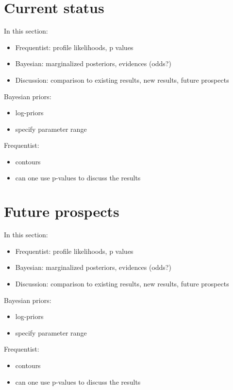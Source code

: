 \section{Current status}
\label{examples}

In this section:
\begin{itemize}
  \item Frequentist: profile likelihoods, p values
  \item Bayesian: marginalized posteriors, evidences (odds?)
  \item Discussion: comparison to existing results, new results, future prospects
\end{itemize}

Bayesian priors:
\begin{itemize}
  \item log-priors
  \item specify parameter range
\end{itemize}

Frequentist:
\begin{itemize}
  \item contours
  \item can one use p-values to discuss the results
\end{itemize}


\section{Future prospects}
\label{examples}

In this section:
\begin{itemize}
  \item Frequentist: profile likelihoods, p values
  \item Bayesian: marginalized posteriors, evidences (odds?)
  \item Discussion: comparison to existing results, new results, future prospects
\end{itemize}

Bayesian priors:
\begin{itemize}
  \item log-priors
  \item specify parameter range
\end{itemize}

Frequentist:
\begin{itemize}
  \item contours
  \item can one use p-values to discuss the results
\end{itemize}

